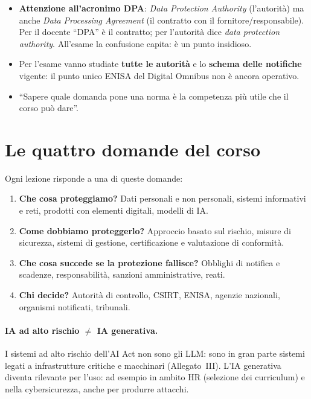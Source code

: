 \begin{esame}
\begin{itemize}
  \item \textbf{Attenzione all'acronimo DPA}: \emph{Data Protection Authority} (l'autorità) ma anche
    \emph{Data Processing Agreement} (il contratto con il fornitore/responsabile). Per il docente
    ``DPA'' è il contratto; per l'autorità dice \emph{data protection authority}. All'esame la
    confusione capita: è un punto insidioso.
  \item Per l'esame vanno studiate \textbf{tutte le autorità} e lo \textbf{schema delle notifiche}
    vigente: il punto unico ENISA del Digital Omnibus non è ancora operativo.
  \item ``Sapere quale domanda pone una norma è la competenza più utile che il corso può dare''.
\end{itemize}
\end{esame}

\section{Le quattro domande del corso}
Ogni lezione risponde a una di queste domande:
\begin{enumerate}
  \item \textbf{Che cosa proteggiamo?} Dati personali e non personali, sistemi informativi e reti,
    prodotti con elementi digitali, modelli di IA.
  \item \textbf{Come dobbiamo proteggerlo?} Approccio basato sul rischio, misure di sicurezza, sistemi
    di gestione, certificazione e valutazione di conformità.
  \item \textbf{Che cosa succede se la protezione fallisce?} Obblighi di notifica e scadenze,
    responsabilità, sanzioni amministrative, reati.
  \item \textbf{Chi decide?} Autorità di controllo, CSIRT, ENISA, agenzie nazionali, organismi
    notificati, tribunali.
\end{enumerate}

\paragraph{IA ad alto rischio $\neq$ IA generativa.} I sistemi ad alto rischio dell'AI Act non sono
gli LLM: sono in gran parte sistemi legati a infrastrutture critiche e macchinari (Allegato~III). L'IA
generativa diventa rilevante per l'uso: ad esempio in ambito HR (selezione dei curriculum) e nella
cybersicurezza, anche per produrre attacchi.

